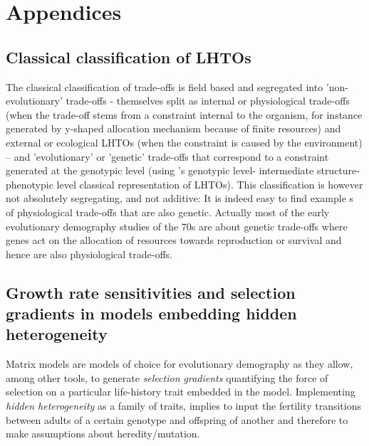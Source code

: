 \documentclass[10pt,a4paper]{article}
\begin{document}
\section{Appendices}

\subsection{Classical classification of LHTOs}
\label{sec:app_ClassLHTOs}
The classical classification of trade-offs is field based and segregated into 'non-evolutionary' trade-offs - themselves split as internal or physiological trade-offs  (when the trade-off stems  from a constraint internal to the organism, for instance generated by y-shaped allocation mechanism because of finite resources) and external or ecological LHTOs (when the constraint is caused by the environment) – and 'evolutionary' or 'genetic' trade-offs that correspond to a constraint generated at the genotypic level (using \citet{Stearns1989b}'s genotypic level- intermediate structure-phenotypic level  classical representation of LHTOs). This classification is however not absolutely segregating, and not additive: It is indeed easy to find example s of physiological trade-offs that are also genetic. Actually most of the early evolutionary demography studies  of the 70s are about genetic  trade-offs where genes act on the allocation of resources towards reproduction or survival and hence are also physiological trade-offs.

\subsection{Growth rate sensitivities and selection gradients in models embedding hidden heterogeneity}
\label{sec:selgradsensi}
Matrix models are models of choice for evolutionary demography as they allow, among other tools, to generate \emph{selection gradients} quantifying the force of selection on a particular life-history trait embedded in the model.
Implementing \emph{hidden heterogeneity} as a family of traits, implies to input the fertility transitions between adults of a certain genotype and offspring of another and therefore to make assumptions about heredity/mutation.\\
 
\end{document}
